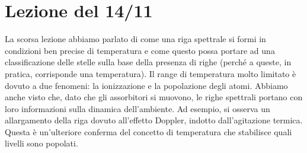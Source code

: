 \documentclass[a4paper,11pt]{article}
\begin{document}
    
    \newpage
    \section{Lezione del 14/11}
La scorsa lezione abbiamo parlato di come una riga spettrale si formi in condizioni ben precise di temperatura e come questo possa portare ad una classificazione delle stelle sulla base della presenza di righe (perché a queste, in pratica, corrisponde una temperatura). Il range di temperatura molto limitato è dovuto a due fenomeni: la ionizzazione e la popolazione degli atomi. Abbiamo anche visto che, dato che gli assorbitori si muovono, le righe spettrali portano con loro informazioni sulla dinamica dell'ambiente. Ad esempio, si osserva un allargamento della riga dovuto all'effetto Doppler, indotto dall'agitazione termica. Questa è un'ulteriore conferma del concetto di temperatura che stabilisce quali livelli sono popolati.
\end{document}
